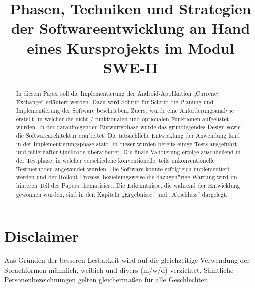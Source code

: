 \documentclass[conference]{IEEEtran}
\begin{document}
\title{Phasen, Techniken und Strategien der Softwareentwicklung an Hand eines Kursprojekts im Modul SWE-II}

\author{
\and
{}
\and
{}
}

\maketitle

\begin{abstract}
	In diesem Paper soll die Implementierung der Android-Applikation „Currency Exchange“ erläutert werden. Dazu wird Schritt für Schritt die Planung und Implementierung der Software beschrieben. Zuerst wurde eine Anforderungsanalyse erstellt, in welcher  die nicht-/ funktionalen und optionalen Funktionen aufgelistet wurden. In der darauffolgenden Entwurfsphase wurde das grundlegendes Design sowie die Softwarearchitektur erarbeitet. Die tatsächliche Entwicklung der Anwendung fand in der Implementierungsphase statt. In dieser wurden bereits einige Tests ausgeführt und fehlerhafter Quellcode überarbeitet. Die finale Validierung erfolge anschließend in der Testphase, in welcher verschiedene konventionelle, teils unkonventionelle Testmethoden angewendet wurden. Die Software konnte erfolgreich implementiert werden und der Rollout-Prozess, beziehungsweise die dazugehörige Wartung wird im hinteren Teil des Papers thematisiert. Die Erkenntnisse, die während der Entwicklung gewonnen wurden, sind in den Kapiteln „Ergebnisse“ und „Abschluss“ dargelegt.
\end{abstract}

\section{Disclaimer}
Aus Gründen der besseren Lesbarkeit wird auf die gleichzeitige Verwendung der Sprachformen männlich, weibich und divers (m/w/d) verzichtet. Sämtliche Personenbezeichnungen gelten gleichermaßen für alle Geschlechter.
\end{document}
